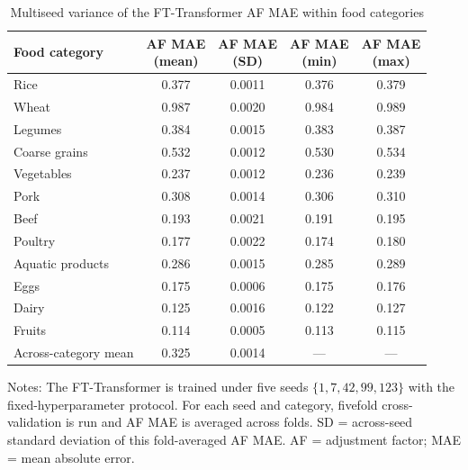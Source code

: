 \documentclass[preprint,12pt,authoryear]{elsarticle}
\begin{document}
\begin{table}[htbp]
\centering
\begin{threeparttable}
\caption{Multiseed variance of the FT-Transformer AF MAE within food categories}
\label{tab:multiseed}
\small
\setlength{\tabcolsep}{0pt} 
\begin{tabular*}{\textwidth}{@{\extracolsep{\fill}} l cccc @{}}
\toprule
Food category & \shortstack{AF MAE\\(mean)} & \shortstack{AF MAE\\(SD)} & \shortstack{AF MAE\\(min)} & \shortstack{AF MAE\\(max)} \\
\midrule
Rice             & 0.377 & 0.0011 & 0.376 & 0.379 \\
Wheat            & 0.987 & 0.0020 & 0.984 & 0.989 \\
Legumes          & 0.384 & 0.0015 & 0.383 & 0.387 \\
Coarse grains    & 0.532 & 0.0012 & 0.530 & 0.534 \\
Vegetables       & 0.237 & 0.0012 & 0.236 & 0.239 \\
Pork             & 0.308 & 0.0014 & 0.306 & 0.310 \\
Beef             & 0.193 & 0.0021 & 0.191 & 0.195 \\
Poultry          & 0.177 & 0.0022 & 0.174 & 0.180 \\
Aquatic products & 0.286 & 0.0015 & 0.285 & 0.289 \\
Eggs             & 0.175 & 0.0006 & 0.175 & 0.176 \\
Dairy            & 0.125 & 0.0016 & 0.122 & 0.127 \\
Fruits           & 0.114 & 0.0005 & 0.113 & 0.115 \\
\midrule
\addlinespace
Across-category mean & 0.325 & 0.0014 & --- & --- \\
\bottomrule
\end{tabular*}
\begin{tablenotes}[flushleft]
\scriptsize
\item Notes: The FT-Transformer is trained under five seeds $\{1, 7, 42, 99, 123\}$ with the fixed-hyperparameter protocol. For each seed and category, fivefold cross-validation is run and AF MAE is averaged across folds. SD = across-seed standard deviation of this fold-averaged AF MAE. AF = adjustment factor; MAE = mean absolute error.
\end{tablenotes}
\end{threeparttable}
\end{table}
\end{document}
